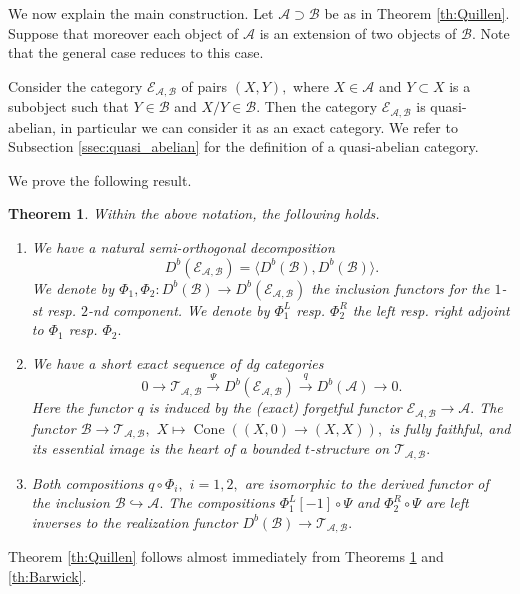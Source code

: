 \documentclass[11pt,leqno]{amsart}
\newtheorem{theo}{Theorem}[section]
\numberwithin{equation}{section}
\def\B{{\mathcal B}}
\newcommand{\xto}{\xrightarrow}
\newcommand{\hto}{\hookrightarrow}
\newcommand{\Cone}{\operatorname{Cone}}
\newcommand{\cA}{{\mathcal A}}
\newcommand{\cB}{{\mathcal B}}
\newcommand{\cE}{{\mathcal E}}
\newcommand{\cT}{{\mathcal T}}
\newcommand{\la}{\langle}
\newcommand{\ra}{\rangle}
\begin{document}
We now explain the main construction. Let $\cA\supset \cB$ be as in Theorem \ref{th:Quillen}. Suppose that moreover each object of $\cA$ is an extension of two objects of $\cB.$ Note that the general case reduces to this case.

Consider the category $\cE_{\cA,\cB}$ of pairs $(X,Y),$ where $X\in\cA$ and $Y\subset X$ is a subobject such that $Y\in\cB$ and $X/Y\in\cB.$ Then the category $\cE_{\cA,\cB}$ is quasi-abelian, in particular we can consider it as an exact category. We refer to Subsection \ref{ssec:quasi_abelian} for the definition of a quasi-abelian category. 

We prove the following result.

\begin{theo}\label{th:key_construction_intro}
Within the above notation, the following holds.
\begin{enumerate}[label=(\roman*), ref=(\roman*)]
	\item We have a natural semi-orthogonal decomposition
	\begin{equation*}
		D^b(\cE_{\cA,\cB})=\la D^b(\cB), D^b(\cB)\ra.
	\end{equation*}
	We denote by $\Phi_1,\Phi_2:D^b(\cB)\to D^b(\cE_{\cA,\cB})$ the inclusion functors for the $1$-st resp. $2$-nd component. We denote by $\Phi_1^L$ resp. $\Phi_2^R$ the left resp. right adjoint to $\Phi_1$ resp. $\Phi_2.$ \label{SOD}
	\item We have a short exact sequence of dg categories
	\begin{equation}\label{eq:key_ses}
		0\to \cT_{\cA,\cB}\xto{\Psi} D^b(\cE_{\cA,\cB})\xto{q} D^b(\cA)\to 0.
	\end{equation}
	Here the functor $q$ is induced by the (exact) forgetful functor $\cE_{\cA,\cB}\to \cA.$ The functor $\B\to \cT_{\cA,\cB},$ $X\mapsto\Cone((X,0)\to (X,X)),$ is fully faithful, and its essential image is the heart of a bounded $t$-structure on $\cT_{\cA,\cB}.$ \label{ses}
	\item Both compositions $q\circ \Phi_i,$ $i=1,2,$ are isomorphic to the derived functor of the inclusion $\cB\hto\cA.$ The compositions $\Phi_1^L[-1]\circ \Psi$ and $\Phi_2^R\circ \Psi$ are left inverses to the realization functor $D^b(\cB)\to \cT_{\cA,\cB}.$ \label{functors_on_components}
\end{enumerate}
\end{theo}

Theorem \ref{th:Quillen} follows almost immediately from Theorems \ref{th:key_construction_intro} and \ref{th:Barwick}. 
  
\end{document}
